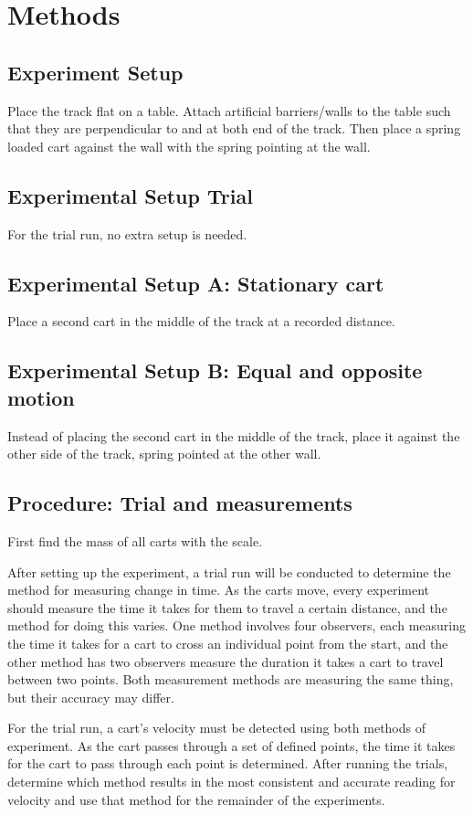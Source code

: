 \documentclass[12pt]{article}
\begin{document}
    \section{Methods}
        \subsection{Experiment Setup}
            Place the track flat on a table. Attach artificial barriers/walls to
            the table such that they are perpendicular to and at both end of the 
            track. Then place a spring loaded cart against the wall with the spring
            pointing at the wall.
        \subsection{Experimental Setup Trial}
            For the trial run, no extra setup is needed.
        \subsection{Experimental Setup A: Stationary cart}
            Place a second cart in the middle of the track at a recorded distance.
        \subsection{Experimental Setup B: Equal and opposite motion}
            Instead of placing the second cart in the middle of the track, place
            it against the other side of the track, spring pointed at the other
            wall.

        \subsection{Procedure: Trial and measurements}
            \par First find the mass of all carts with the scale.
            \par After setting up the experiment, a trial run will be conducted to
            determine the method for measuring change in time. As the carts move,
            every experiment should measure the time it takes for them to travel
            a certain distance, and the method for doing this varies. One method
            involves four observers, each measuring the time it takes for a cart
            to cross an individual point from the start, and the other method
            has two observers measure the duration it takes a cart to travel
            between two points. Both measurement methods are measuring the same
            thing, but their accuracy may differ.
            \par For the trial run, a cart's velocity must be detected using both
            methods of experiment. As the cart passes through a set of defined
            points, the time it takes for the cart to pass through each point is
            determined. After running the trials, determine which method results
            in the most consistent and accurate reading for velocity and use
            that method for the remainder of the experiments.
\end{document}
